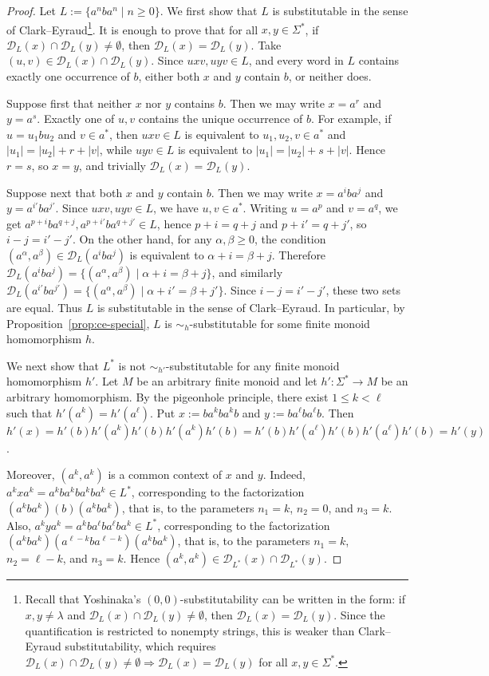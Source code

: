 \documentclass[11pt,a4paper]{article}
\newcommand{\D}{\mathcal{D}}
\begin{document}
\begin{proof}
Let $L:=\{a^n b a^n\mid n\ge0\}$. We first show that $L$ is substitutable in the sense of Clark--Eyraud\footnote{Recall that Yoshinaka's $(0,0)$-substitutability can be written in the form: if $x,y\neq\lambda$ and $\D_L(x)\cap\D_L(y)\neq\emptyset$, then $\D_L(x)=\D_L(y)$. Since the quantification is restricted to nonempty strings, this is weaker than Clark--Eyraud substitutability, which requires $\D_L(x)\cap\D_L(y)\neq\emptyset \Rightarrow \D_L(x)=\D_L(y)$ for all $x,y\in\Sigma^*$.}. It is enough to prove that for all $x,y\in\Sigma^*$, if $\D_L(x)\cap\D_L(y)\neq\emptyset$, then $\D_L(x)=\D_L(y)$. Take $(u,v)\in\D_L(x)\cap\D_L(y)$. Since $uxv,uyv\in L$, and every word in $L$ contains exactly one occurrence of $b$, either both $x$ and $y$ contain $b$, or neither does.

Suppose first that neither $x$ nor $y$ contains $b$. Then we may write $x=a^r$ and $y=a^s$. Exactly one of $u,v$ contains the unique occurrence of $b$. For example, if $u=u_1 b u_2$ and $v\in a^*$, then $uxv\in L$ is equivalent to $u_1,u_2,v\in a^*$ and $|u_1|=|u_2|+r+|v|$, while $uyv\in L$ is equivalent to $|u_1|=|u_2|+s+|v|$. Hence $r=s$, so $x=y$, and trivially $\D_L(x)=\D_L(y)$.

Suppose next that both $x$ and $y$ contain $b$. Then we may write $x=a^i b a^j$ and $y=a^{i'} b a^{j'}$. Since $uxv,uyv\in L$, we have $u,v\in a^*$. Writing $u=a^p$ and $v=a^q$, we get $a^{p+i} b a^{q+j},a^{p+i'} b a^{q+j'}\in L$, hence $p+i=q+j$ and $p+i'=q+j'$, so $i-j=i'-j'$. On the other hand, for any $\alpha,\beta\ge0$, the condition $(a^\alpha,a^\beta)\in\D_L(a^i b a^j)$ is equivalent to $\alpha+i=\beta+j$. Therefore $\D_L(a^i b a^j)=\{(a^\alpha,a^\beta)\mid \alpha+i=\beta+j\}$, and similarly $\D_L(a^{i'} b a^{j'})=\{(a^\alpha,a^\beta)\mid \alpha+i'=\beta+j'\}$. Since $i-j=i'-j'$, these two sets are equal. Thus $L$ is substitutable in the sense of Clark--Eyraud. In particular, by Proposition~\ref{prop:ce-special}, $L$ is $\sim_h$-substitutable for some finite monoid homomorphism $h$.

We next show that $L^*$ is not $\sim_{h'}$-substitutable for any finite monoid homomorphism $h'$. Let $M$ be an arbitrary finite monoid and let $h':\Sigma^*\to M$ be an arbitrary homomorphism. By the pigeonhole principle, there exist $1\le k<\ell$ such that $h'(a^k)=h'(a^\ell)$. Put $x:=ba^kba^kb$ and $y:=ba^\ell ba^\ell b$. Then $h'(x)=h'(b)h'(a^k)h'(b)h'(a^k)h'(b)=h'(b)h'(a^\ell)h'(b)h'(a^\ell)h'(b)=h'(y)$.

Moreover, $(a^k,a^k)$ is a common context of $x$ and $y$. Indeed, $a^kxa^k=a^kba^kba^kba^k\in L^*$, corresponding to the factorization $(a^kba^k)(b)(a^kba^k)$, that is, to the parameters $n_1=k$, $n_2=0$, and $n_3=k$. Also, $a^kya^k=a^kba^\ell ba^\ell ba^k\in L^*$, corresponding to the factorization $(a^kba^k)(a^{\ell-k}ba^{\ell-k})(a^kba^k)$, that is, to the parameters $n_1=k$, $n_2=\ell-k$, and $n_3=k$. Hence $(a^k,a^k)\in\D_{L^*}(x)\cap\D_{L^*}(y)$.


\end{proof}
\end{document}
